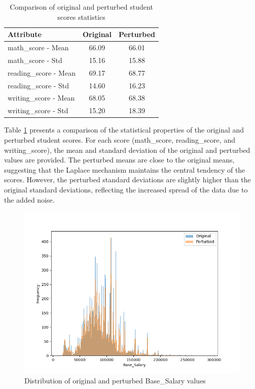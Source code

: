 \begin{table}[H]
\centering
\begin{tabular}{l|c|c}
\hline
\textbf{Attribute} & \textbf{Original} & \textbf{Perturbed} \\
\hline
math\_score - Mean & 66.09 & 66.01 \\
math\_score - Std & 15.16 & 15.88 \\
reading\_score - Mean & 69.17 & 68.77 \\
reading\_score - Std & 14.60 & 16.23 \\
writing\_score - Mean & 68.05 & 68.38 \\
writing\_score - Std & 15.20 & 18.39 \\
\hline
\end{tabular}

\caption{Comparison of original and perturbed student scores statistics}
\label{tab:student_scores_stats}
\end{table}
Table \ref{tab:student_scores_stats} presents a comparison of the statistical properties of the original and perturbed student scores. For each score (math\_score, reading\_score, and writing\_score), the mean and standard deviation of the original and perturbed values are provided. The perturbed means are close to the original means, suggesting that the Laplace mechanism maintains the central tendency of the scores. However, the perturbed standard deviations are slightly higher than the original standard deviations, reflecting the increased spread of the data due to the added noise.

\begin{figure}[H]
\centering
\includegraphics[width=1\textwidth]{report/media/salaries.png}
\caption{Distribution of original and perturbed Base\_Salary values}
\label{fig:base_salary_distribution}
\end{figure}

